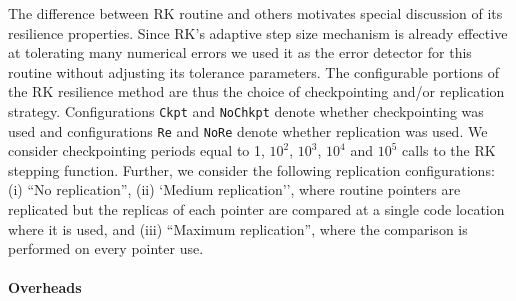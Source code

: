 \documentclass{sig-alternate}
\begin{document}
{The difference between RK routine and others motivates special discussion of its resilience properties.
Since RK's adaptive step size mechanism is already effective at tolerating many numerical errors we used it as the error detector for this routine without adjusting its tolerance parameters.
The configurable portions of the RK resilience method are thus the choice of checkpointing and/or replication strategy.
Configurations \texttt{Ckpt} and \texttt{NoChkpt} denote whether checkpointing was used and configurations \texttt{Re} and \texttt{NoRe} denote whether replication was used.
We consider checkpointing periods equal to 1, $10^2$, $10^3$, $10^4$ and $10^5$ calls to the RK stepping function.
Further, we consider the following replication configurations: (i) ``No replication'', (ii) `Medium replication'', where routine pointers are replicated but the replicas of each pointer are compared at a single code location where it is used, and (iii) ``Maximum replication'', where the comparison is performed on every pointer use.

\paragraph{Overheads}



}
\end{document}
